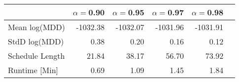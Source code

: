 \begin{tabular} {lrrrrr} 
 \hline \hline 
&$\alpha = $0.90&$\alpha = $0.95&$\alpha = $0.97&$\alpha = $0.98\\ 
 \hline 
Mean log(MDD)&-1032.38&-1032.07&-1031.96&-1031.91\\ 
StdD log(MDD)&0.38&0.20&0.16&0.12\\ 
Schedule Length&21.84&38.17&56.70&73.92\\ 
Runtime [Min]&0.69&1.09&1.45&1.84\\ 
\hline 
\end{tabular}